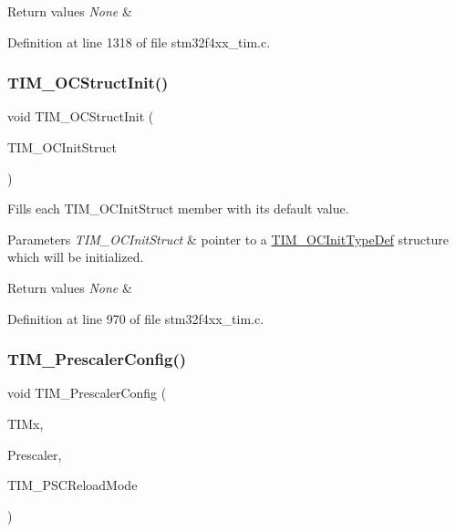 \begin{DoxyRetVals}{Return values}
{\em None} & \\
\hline
\end{DoxyRetVals}


Definition at line 1318 of file stm32f4xx\+\_\+tim.\+c.

\mbox{\label{group___t_i_m_ga394683c78ae02837882e36014e11643e}} 
\subsubsection{\texorpdfstring{T\+I\+M\+\_\+\+O\+C\+Struct\+Init()}{TIM\_OCStructInit()}}
{\footnotesize\ttfamily void T\+I\+M\+\_\+\+O\+C\+Struct\+Init (\begin{DoxyParamCaption}\item[{\hyperlink{struct_t_i_m___o_c_init_type_def}{T\+I\+M\+\_\+\+O\+C\+Init\+Type\+Def} $\ast$}]{T\+I\+M\+\_\+\+O\+C\+Init\+Struct }\end{DoxyParamCaption})}



Fills each T\+I\+M\+\_\+\+O\+C\+Init\+Struct member with its default value. 


\begin{DoxyParams}{Parameters}
{\em T\+I\+M\+\_\+\+O\+C\+Init\+Struct} & pointer to a \hyperlink{struct_t_i_m___o_c_init_type_def}{T\+I\+M\+\_\+\+O\+C\+Init\+Type\+Def} structure which will be initialized. \\
\hline
\end{DoxyParams}

\begin{DoxyRetVals}{Return values}
{\em None} & \\
\hline
\end{DoxyRetVals}


Definition at line 970 of file stm32f4xx\+\_\+tim.\+c.

\mbox{\label{group___t_i_m_ga45c6fd9041baf7f64c121e0172f305c7}} 
\subsubsection{\texorpdfstring{T\+I\+M\+\_\+\+Prescaler\+Config()}{TIM\_PrescalerConfig()}}
{\footnotesize\ttfamily void T\+I\+M\+\_\+\+Prescaler\+Config (\begin{DoxyParamCaption}\item[{\hyperlink{struct_t_i_m___type_def}{T\+I\+M\+\_\+\+Type\+Def} $\ast$}]{T\+I\+Mx,  }\item[{uint16\+\_\+t}]{Prescaler,  }\item[{uint16\+\_\+t}]{T\+I\+M\+\_\+\+P\+S\+C\+Reload\+Mode }\end{DoxyParamCaption})}



